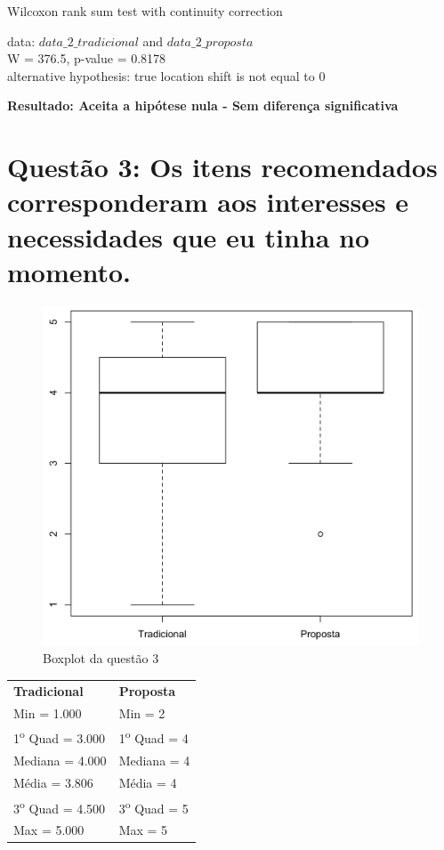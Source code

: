 Wilcoxon rank sum test with continuity correction

\noindent
data:  $data\_2\_tradicional$ and $data\_2\_proposta$\\
W = 376.5, p-value = 0.8178\\
alternative hypothesis: true location shift is not equal to 0

\noindent
\textbf{Resultado: Aceita a hipótese nula - Sem diferença significativa}

\newpage
\section{Questão 3: Os itens recomendados corresponderam aos  interesses e necessidades que eu tinha no momento.}

\begin{figure}[htb]
  \caption{\label{fig:questao3-boxplot}Boxplot da questão 3}
  \begin{center}
      \includegraphics[scale=0.4]{./Figuras/questao3-boxplot.png}
  \end{center}
\end{figure}

\begin{table}[h]
\begin{tabular}{p{}p{}}
\textbf{Tradicional} & \textbf{Proposta} \\
Min = 1.000 & Min = 2\\
1\textsuperscript{o} Quad = 3.000 & 1\textsuperscript{o} Quad = 4\\
Mediana = 4.000 & Mediana = 4\\
Média = 3.806 & Média = 4\\
3\textsuperscript{o} Quad = 4.500 & 3\textsuperscript{o} Quad = 5\\
Max = 5.000 & Max = 5\\
\end{tabular}
\end{table}

